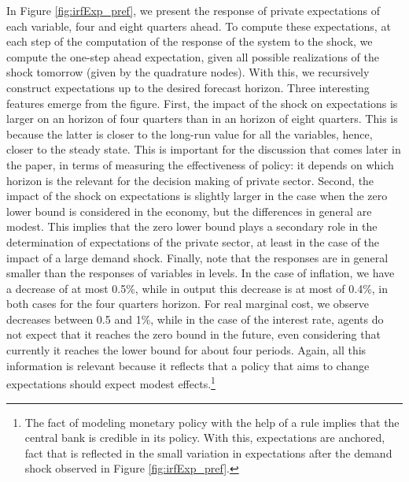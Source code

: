 \documentclass[11pt]{article}
\numberwithin{equation}{section}
\begin{document}
In Figure \ref{fig:irfExp_pref}, we present the response of private expectations of each variable, four and eight quarters ahead. To compute these expectations, at each step of the computation of the response of the system to the shock, we compute the one-step ahead expectation, given all possible realizations of the shock tomorrow (given by the quadrature nodes). With this, we recursively construct expectations up to the desired forecast horizon. Three interesting features emerge from the figure. First, the impact of the shock on expectations is larger on an horizon of four quarters than in an horizon of eight quarters. This is because the latter is closer to the long-run value for all the variables, hence, closer to the steady state. This is important for the discussion that comes later in the paper, in terms of measuring the effectiveness of policy: it depends on which horizon is the relevant for the decision making of private sector. Second, the impact of the shock on expectations is slightly larger in the case when the zero lower bound is considered in the economy, but the differences in general are modest. This implies that the zero lower bound plays a secondary role in the determination of expectations of the private sector, at least in the case of the impact of a large demand shock. Finally, note that the responses are in general smaller than the responses of variables in levels. In the case of inflation, we have a decrease of at most 0.5\%, while in output this decrease is at most of 0.4\%, in both cases for the four quarters horizon. For real marginal cost, we observe decreases between 0.5 and 1\%, while in the case of the interest rate, agents do not expect that it reaches the zero bound in the future, even considering that currently it reaches the lower bound for about four periods. Again, all this information is relevant because it reflects that a policy that aims to change expectations should expect modest effects.\footnote{The fact of modeling monetary policy with the help of a rule implies that the central bank is credible in its policy. With this, expectations are anchored, fact that is reflected in the small variation in expectations after the demand shock observed in Figure \ref{fig:irfExp_pref}.}
\end{document}
